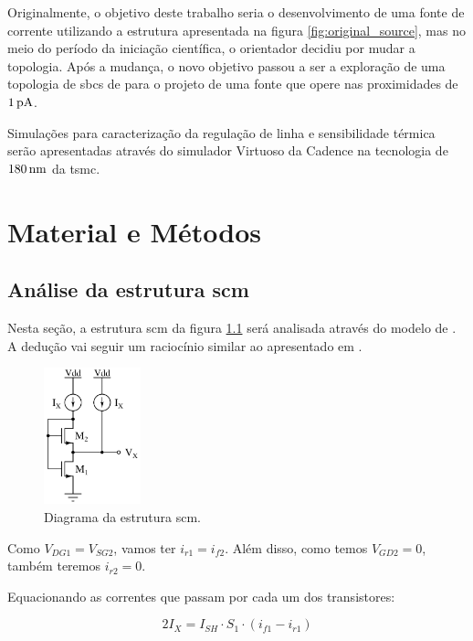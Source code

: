 \documentclass[10pt,a4paper]{extreport}
\newcommand{\?}{\stackrel{?}{=}}
\newcommand{\sis}[2]{\complexnum{#1}\,\si[per-mode=symbol]{#2}}
\begin{document}
Originalmente, o objetivo deste trabalho seria o desenvolvimento de uma fonte de corrente utilizando a estrutura apresentada na figura \ref{fig:original_source}, mas no meio do período da iniciação científica, o orientador decidiu por mudar a topologia. Após a mudança, o novo objetivo passou a ser a exploração de uma topologia de \acrfull{sbcs} de \cite{sbcs} para o projeto de uma fonte que opere nas proximidades de $\sis{1}{\pico\ampere}$.

Simulações para caracterização da regulação de linha e sensibilidade térmica serão apresentadas através do simulador Virtuoso da Cadence na tecnologia de $\sis{180}{\nano\meter}$ da \acrfull{tsmc}.

\chapter{Material e Métodos}
\section{Análise da estrutura \acrshort{scm}}

Nesta seção, a estrutura \acrshort{scm} da figura \ref{fig:scm_circuit} será analisada através do modelo de \cite{acm:book}. A dedução vai seguir um raciocínio similar ao apresentado em \cite{sbcs}.

\begin{figure}
    \centering
    \vspace{-0.4cm}
    \includegraphics[width=0.25\textwidth]{Imagens/scm_circuit.jpg}
    \caption{Diagrama da estrutura \acrshort{scm}.}
    \label{fig:scm_circuit}
\end{figure}

Como $V_{DG1}=V_{SG2}$, vamos ter $i_{r1}=i_{f2}$. Além disso, como temos $V_{GD2}=0$, também teremos $i_{r2}=0$.

Equacionando as correntes que passam por cada um dos transistores:

\begin{equation}
    \label{eq:scm_m1_current}
    2I_X=I_{SH}\cdot S_1\cdot\left(i_{f1}-i_{r1}\right)
\end{equation}
\end{document}
